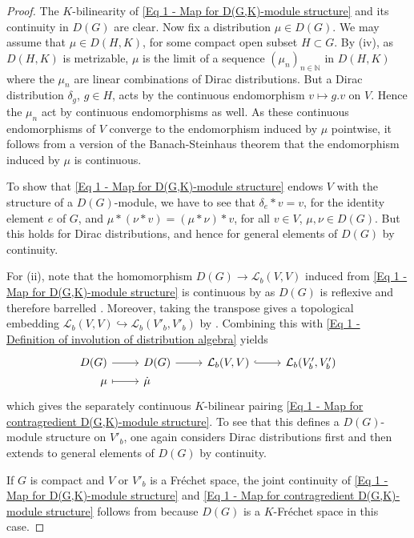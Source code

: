 \documentclass[a4paper, reqno, 10pt]{amsart}
\theoremstyle{definition}
\numberwithin{equation}{section}
\newcommand{\mto}{\mapsto}
\newcommand{\ra}{\rightarrow}
\newcommand{\BN}{{\mathbb {N}}}
\newcommand{\CL}{{\mathcal {L}}}
\begin{document}
\begin{proof}
	The $K$-bilinearity of \eqref{Eq 1 - Map for D(G,K)-module structure} and its continuity in $D(G)$ are clear.
	Now fix a distribution $\mu \in D(G)$. 
	We may assume that $\mu \in D(H,K)$, for some compact open subset $H \subset G$.
	By  (iv), as $D(H,K)$ is metrizable, $\mu$ is the limit of a sequence $(\mu_n)_{n\in \BN}$ in $D(H,K)$ where the $\mu_n$ are linear combinations of Dirac distributions.
	But a Dirac distribution $\delta_g$, $g\in H$, acts by the continuous endomorphism $v\mto g.v$ on $V$.
	Hence the $\mu_n$ act by continuous endomorphisms as well.
	As these continuous endomorphisms of $V$ converge to the endomorphism induced by $\mu$ pointwise, it follows from a version of the Banach-Steinhaus theorem \cite[III.\ \S 4.2, Cor.\ 2]{Bourbaki87TopVectSp1to5} that the endomorphism induced by $\mu$ is continuous.
	
	To show that \eqref{Eq 1 - Map for D(G,K)-module structure} endows $V$ with the structure of a $D(G)$-module, we have to see that $\delta_e \ast v = v$, for the identity element $e$ of $G$, and $\mu \ast (\nu \ast v) = (\mu \ast \nu) \ast v$, for all $v\in V$, $\mu, \nu \in D(G)$.
	But this holds for Dirac distributions, and hence for general elements of $D(G)$ by continuity.
	
	For (ii), note that the homomorphism $D(G) \ra \CL_b(V,V)$ induced from \eqref{Eq 1 - Map for D(G,K)-module structure} is continuous by \cite[III.\ \S 5.3, Prop.\ 6]{Bourbaki87TopVectSp1to5} as $D(G)$ is reflexive and therefore barrelled \cite[Lemma 15.4]{Schneider02NonArchFunctAna}.
	Moreover, taking the transpose gives a topological embedding $\CL_b (V,V) \hookrightarrow \CL_b(V'_b,V'_b) $ by \cite[Prop.\ 1.1.36]{Emerton17LocAnVect}.
	Combining this with \eqref{Eq 1 - Definition of involution of distribution algebra} yields
	\begin{equation*}
		\begin{tikzcd}[
			,row sep = 0ex
			,/tikz/column 1/.append style={anchor=base east}
			,/tikz/column 2/.append style={anchor=base west}
			]
			D(G) \ar[r] &D(G) \ar[r] &\CL_b(V,V) \ar[r, hookrightarrow] & \CL_b(V'_b,V'_b) \\
			\mu \ar[r, mapsto] & \dot{\mu} &&
		\end{tikzcd}
	\end{equation*}
	which gives the separately continuous $K$-bilinear pairing \eqref{Eq 1 - Map for contragredient D(G,K)-module structure}.
	To see that this defines a $D(G)$-module structure on $V'_b$, one again considers Dirac distributions first and then extends to general elements of $D(G)$ by continuity.
	
	If $G$ is compact and $V$ or $V'_b$ is a Fr\'echet space, the joint continuity of \eqref{Eq 1 - Map for D(G,K)-module structure} and \eqref{Eq 1 - Map for contragredient D(G,K)-module structure} follows from \cite[III.\ \S 5.2 Cor.\ 1]{Bourbaki87TopVectSp1to5} because $D(G)$ is a $K$-Fr\'echet space in this case.
\end{proof}
\end{document}
